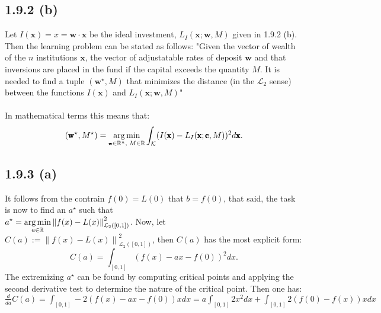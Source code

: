 \documentclass{exam}
\DeclareMathOperator*{\argmin}{arg\,min}
\begin{document}
\subsection*{1.9.2 (b)}
Let $I(\pmb{\text{x}}) = x = \pmb{\text{w}} \cdot \pmb{\text{x}}$ be the ideal investment, $L_{I}(\pmb{\text{x}};\pmb{\text{w}},M)$ given in 1.9.2 (b). Then the learning problem 
can be stated as follows: "Given the vector of wealth of the $n$ institutions $\pmb{\text{x}}$, the vector of adjustatable rates of deposit $\pmb{\text{w}}$ and that inversions are placed 
in the fund if the capital exceeds the quantity $M$. It is needed to find a tuple $(\pmb{\text{w}}^\star,M)$ that minimizes the distance (in the $\mathcal{L}_2$ sense) between the functions
$I(\pmb{\text{x}})$ and $L_{I}(\pmb{\text{x}};\pmb{\text{w}},M)$" \\
\\
In mathematical terms this means that: \begin{equation*} 
    (\pmb{\text{w}}^\star,M^\star) = \argmin_{\tiny\pmb{\text{w}} \in \mathbb{R}^n \text{, } M \in \mathbb{R}} \displaystyle \int_{\mathcal{K}} (I(\pmb{\text{x}}) - L_{I}(\pmb{\text{x}};\pmb{\text{c}},M))^2 d \pmb{\text{x}}.
\end{equation*} 

\subsection*{1.9.3 (a)}
It follows from the contrain $f(0) = L(0)$ that $b = f(0)$, that said, the task is now to find an $a^\star$ such that\\
$\displaystyle a^\star = \argmin_{ \tiny a \in \mathbb{R}} {\lVert f(x) - L(x) \rVert}^2_{\mathcal{L}_2([0,1])}$. Now, let $C(a) := {\lVert f(x) - L(x) \rVert}^2_{\mathcal{L}_2([0,1])}$, then $C(a)$ has the most explicit form: 
\begin{equation*}
    C(a) = \displaystyle \int_{[0,1]} (f(x) - ax -f(0))^2 d x.
\end{equation*}
The extremizing $a^\star$ can be found by computing critical points and applying the second derivative test to determine the nature of the critical point. Then one has: \\

$\frac{d}{da} C(a) = \displaystyle\int_{[0,1]} -2(f(x) - ax -f(0)) x d x = a \displaystyle \int_{[0,1]} 2x^2 d x +  \displaystyle\int_{[0,1]} 2(f(0) - f(x)) x d x$
\end{document}
